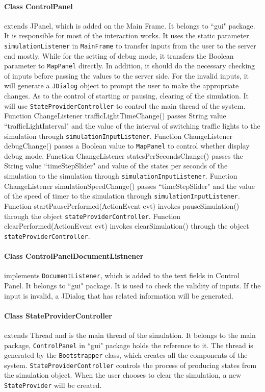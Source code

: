 \documentclass[a4paper,12pt]{article}
\begin{document}
\paragraph{Class ControlPanel} extends JPanel, which is added on the Main Frame. It belongs to ``gui" package. It is responsible for most of the interaction works. It uses the static parameter \verb|simulationListener| in \verb|MainFrame| to transfer inputs from the user to the server end mostly. While for the setting of debug mode, it transfers the Boolean parameter to \verb|MapPanel| directly. In addition, it should do the necessary checking of inputs before passing the values to the server side. For the invalid inputs, it will generate a \verb|JDialog| object to prompt the user to make the appropriate changes. As to the control of starting or pausing, clearing of the simulation. It will use \verb|StateProviderController| to control the main thread of the system. Function ChangeListener trafficLightTimeChange() passes String value ``trafficLightInterval" and the value of the interval of switching traffic lights to the simulation through \verb|simulationInputListener|. Function ChangeListener debugChange() passes a Boolean value to \verb|MapPanel| to control whether display debug mode. Function ChangeListener statesPerSecondsChange() passes the String value ``timeStepSlider" and value of the states per seconds of the simulation to the simulation through \verb|simulationInputListener|. Function ChangeListener simulationSpeedChange() passes ``timeStepSlider" and the value of the speed of timer to the simulation through \verb|simulationInputListener|. Function startPausePerformed(ActionEvent evt) invokes pauseSimulation() through the object \verb|stateProviderController|. Function clearPerformed(ActionEvent evt) invokes clearSimulation() through the object \verb|stateProviderController|. 
\paragraph{Class ControlPanelDocumentListnener} implements \verb|DocumentListener|, which is added to the text fields in Control Panel. It belongs to ``gui" package. It is used to check the validity of inputs. If the input is invalid, a JDialog that has related information will be generated.
\paragraph{Class StateProviderController} extends Thread and is the main thread of the simulation. It belongs to the main package, \verb|ControlPanel| in ``gui" package holds the reference to it. The thread is generated by the \verb|Bootstrapper| class, which creates all the components of the system. \verb|StateProviderController| controls the process of producing states from the simulation object. When the user chooses to clear the simulation, a new \verb|StateProvider| will be created.
\end{document}
